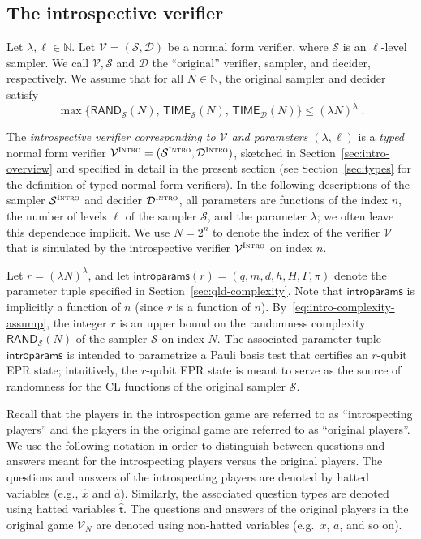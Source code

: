 \documentclass[11pt]{article}
\theoremstyle{definition}
\newcommand{\N}{\ensuremath{\mathbb{N}}}
\newcommand{\sampler}{\mathcal{S}}
\newcommand{\decider}{\mathcal{D}}
\newcommand{\verifier}{\mathcal{V}}
\newcommand{\gamestyle}[1]{\ensuremath{\textsc{#1}}\xspace}
\newcommand{\intro}{\gamestyle{Intro}}
\newcommand{\tvarstyle}[1]{\mathsf{#1}}
\newcommand{\tvar}{\ensuremath{\tvarstyle{t}}}
\newcommand{\introparams}{\mathsf{introparams}}
\newcommand{\TIME}{\mathsf{TIME}}
\newcommand{\RAND}{\mathsf{RAND}}
\begin{document}
\subsection{The introspective verifier}
\label{sec:intro-verifier}

Let $\lambda, \ell \in \N$.
Let $\verifier = (\sampler,\decider)$ be a normal form verifier, where
$\sampler$ is an $\ell$-level sampler.
We call $\verifier, \sampler$ and $\decider$ the ``original'' verifier, sampler,
and decider, respectively.
We assume that for all $N \in \N$, the original sampler and decider satisfy
\begin{equation}
  \label{eq:intro-complexity-assump}
  \max \big\{ \RAND_\sampler(N),\, \TIME_\sampler(N), \,\TIME_\decider(N) \big\}
  \leq (\lambda N)^\lambda\;.
\end{equation}

The \emph{introspective verifier corresponding to $\verifier$ and parameters
  $(\lambda,\ell)$} is a \emph{typed} normal form verifier $\verifier^\intro
=(\sampler^\intro, \decider^\intro)$, sketched in
Section~\ref{sec:intro-overview} and specified in detail in the present section
(see Section~\ref{sec:types} for the definition of typed normal form verifiers).
In the following descriptions of the sampler $\sampler^\intro$ and decider
$\decider^\intro$, all parameters are functions of the index $n$, the number of
levels $\ell$ of the sampler $\sampler$, and the parameter $\lambda$; we often
leave this dependence implicit.
We use $N = 2^n$ to denote the index of the verifier $\verifier$ that is
simulated by the introspective verifier $\verifier^\intro$ on index $n$.

Let $r = (\lambda N)^\lambda$, and let $\introparams(r) =
(q,m,d,h,H,\Gamma,\pi)$ denote the parameter tuple specified in
Section~\ref{sec:qld-complexity}.
Note that $\introparams$ is implicitly a function of $n$ (since $r$ is a
function of $n$).
By~\eqref{eq:intro-complexity-assump}, the integer $r$ is an upper bound on the
randomness complexity $\RAND_\sampler(N)$ of the sampler $\sampler$ on index
$N$.
The associated parameter tuple $\introparams$ is intended to parametrize a Pauli
basis test that certifies an $r$-qubit EPR state; intuitively, the $r$-qubit EPR
state is meant to serve as the source of randomness for the CL functions of the
original sampler $\sampler$.

Recall that the players in the introspection game are referred to as
``introspecting players'' and the players in the original game are referred to
as ``original players''.
We use the following notation in order to distinguish between questions and
answers meant for the introspecting players versus the original players.
The questions and answers of the introspecting players are denoted by hatted
variables (e.g., $\hat{x}$ and $\hat{a}$).
Similarly, the associated question types are denoted using hatted variables
$\hat{\tvar}$.
The questions and answers of the original players in the original game
$\verifier_N$ are denoted using non-hatted variables (e.g.\ $x$, $a$, and so
on).
\end{document}
